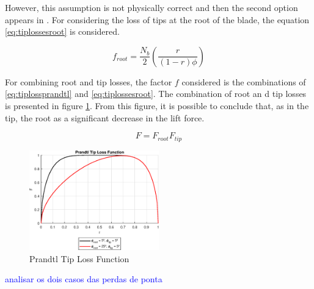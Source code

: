However, this assumption is not physically correct and then the second option appears in \cite{leishman_principles_2006}. For considering the loss of tips at the root of the blade, the equation \ref{eq:tiplossesroot} is considered.

\begin{equation}
    f_{root} = \frac{N_b}{2} \left( \frac{r}{\left(1-r\right)\phi}\right)   
    \label{eq:tiplossesroot}
\end{equation}

For combining root and tip losses, the factor $f$ considered is the combinations of \ref{eq:tiplossprandtl} and \ref{eq:tiplossesroot}. The combination of root an d tip losses is presented in figure \ref{fig:fullprandtltiplossfunction}. From this figure, it is possible to conclude that, as in the tip, the root as a significant decrease in the lift force.

\begin{equation}
    F = F_{root}F_{tip}
\end{equation}

\begin{figure}[!htb]
    \centering
    \includegraphics[width=0.5\textwidth]{Figures/background/tiplosses/prandtltiplossfunction.eps}
    \caption{Prandtl Tip Loss Function}
    \label{fig:fullprandtltiplossfunction}
\end{figure}

\textcolor{blue}{analisar os dois casos das perdas de ponta}
